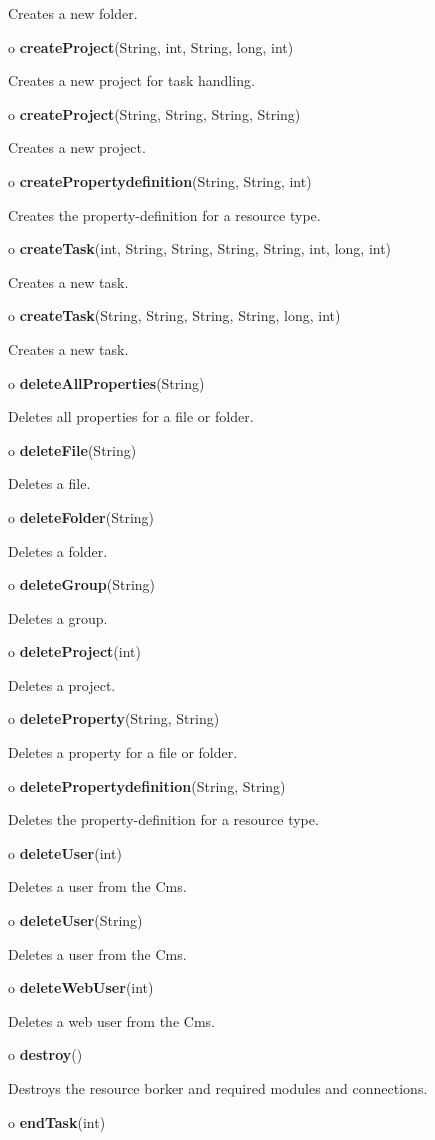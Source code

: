 \begin{description}
Creates a new folder.  
\item o {\bf createProject}(String, int, String, long, int)  

Creates a new project for task handling.  
\item o {\bf createProject}(String, String, String, String)  

Creates a new project.  
\item o {\bf createPropertydefinition}(String, String, int)  

Creates the property-definition for a resource type.  
\item o {\bf createTask}(int, String, String, String, String, int, long, int) 


Creates a new task.  
\item o {\bf createTask}(String, String, String, String, long, int)  

Creates a new task.  
\item o {\bf deleteAllProperties}(String)  

Deletes all properties for a file or folder.  
\item o {\bf deleteFile}(String)  

Deletes a file.  
\item o {\bf deleteFolder}(String)  

Deletes a folder.  
\item o {\bf deleteGroup}(String)  

Deletes a group.  
\item o {\bf deleteProject}(int)  

Deletes a project.  
\item o {\bf deleteProperty}(String, String)  

Deletes a property for a file or folder.  
\item o {\bf deletePropertydefinition}(String, String)  

Deletes the property-definition for a resource type.  
\item o {\bf deleteUser}(int)  

Deletes a user from the Cms.  
\item o {\bf deleteUser}(String)  

Deletes a user from the Cms.  
\item o {\bf deleteWebUser}(int)  

Deletes a web user from the Cms.  
\item o {\bf destroy}()  

Destroys the resource borker and required modules and connections.  
\item o {\bf endTask}(int)  


\end{description}
